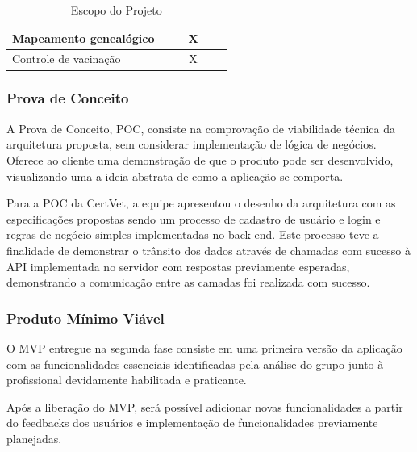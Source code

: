 \documentclass[
    12pt,               %
    openright,          %
    oneside,
    a4paper,            %
    BIBLATEX,           %
    TODO,               %
    english,            %
    brazil              %
    ]{ifsp-spo-inf-ctds}
\begin{document}
\begin{table}[H]
{\begin{tabular}{|lrrrr|r|}
                    \multicolumn{1}{|l|}{Mapeamento genealógico}                      & \multicolumn{1}{r|}{}      & \multicolumn{1}{r|}{}       & \multicolumn{1}{c|}{X}                           \\ \hline
                    \multicolumn{1}{|l|}{Controle de vacinação}                       & \multicolumn{1}{r|}{}      & \multicolumn{1}{r|}{}       & \multicolumn{1}{c|}{X}                           \\ \hline                  
                \end{tabular}%
                }
            \caption{Escopo do Projeto}
            \label{tab:escopo}
            \end{table}
        
        \subsubsection{Prova de Conceito}
        
            A Prova de Conceito, POC, consiste na comprovação de viabilidade técnica da arquitetura proposta, sem considerar implementação de lógica de negócios. Oferece ao cliente uma demonstração de que o produto pode ser desenvolvido, visualizando uma a ideia abstrata de como a aplicação se comporta. 

            Para a POC da CertVet, a equipe apresentou o desenho da arquitetura com as especificações propostas sendo um processo de cadastro de usuário e login e regras de negócio simples implementadas no back end. Este processo teve a finalidade de demonstrar o trânsito dos dados através de chamadas com sucesso à API implementada no servidor com respostas previamente esperadas, demonstrando a comunicação entre as camadas foi realizada com sucesso.
    
        \subsubsection{Produto Mínimo Viável}
        
            O MVP entregue na segunda fase consiste em uma primeira versão da aplicação com as funcionalidades essenciais identificadas pela análise do grupo junto à profissional devidamente habilitada e praticante.
            
            Após a liberação do MVP, será possível adicionar novas funcionalidades a partir do feedbacks dos usuários e implementação de funcionalidades previamente planejadas.
            
\end{document}
